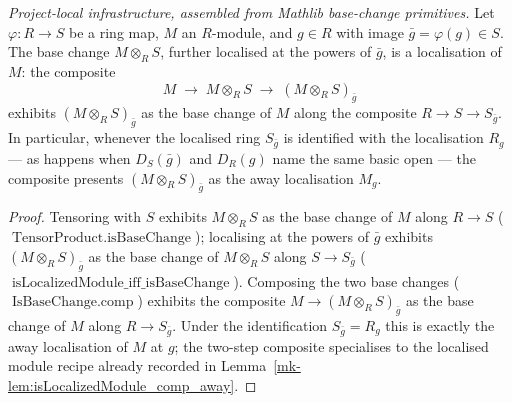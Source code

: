\begin{lemma}\label{mk-lem:isLocalizedModule_baseChange_away}
  \leanok

  \textit{Project-local infrastructure, assembled from Mathlib base-change primitives.}
  Let \(\varphi : R \to S\) be a ring map, \(M\) an \(R\)-module, and \(g \in R\) with image
  \(\bar g = \varphi(g) \in S\). The base change \(M \otimes_R S\), further localised at the powers of
  \(\bar g\), is a localisation of \(M\): the composite
  \[
    M \;\longrightarrow\; M \otimes_R S \;\longrightarrow\; (M \otimes_R S)_{\bar g}
  \]
  exhibits \((M \otimes_R S)_{\bar g}\) as the base change of \(M\) along the composite
  \(R \to S \to S_{\bar g}\). In particular, whenever the localised ring \(S_{\bar g}\) is identified
  with the localisation \(R_g\) --- as happens when \(D_S(\bar g)\) and \(D_R(g)\) name the same basic
  open --- the composite presents \((M \otimes_R S)_{\bar g}\) as the away localisation \(M_g\).
\end{lemma}
\begin{proof}
  \leanok
  Tensoring with \(S\) exhibits \(M \otimes_R S\) as the base change of \(M\) along \(R \to S\)
  (\(\operatorname{TensorProduct.isBaseChange}\)); localising at the powers of \(\bar g\) exhibits
  \((M \otimes_R S)_{\bar g}\) as the base change of \(M \otimes_R S\) along \(S \to S_{\bar g}\)
  (\(\operatorname{isLocalizedModule\_iff\_isBaseChange}\)). Composing the two base changes
  (\(\operatorname{IsBaseChange.comp}\)) exhibits the composite \(M \to (M \otimes_R S)_{\bar g}\) as the
  base change of \(M\) along \(R \to S_{\bar g}\). Under the identification \(S_{\bar g} = R_g\) this is
  exactly the away localisation of \(M\) at \(g\); the two-step composite specialises to the localised
  module recipe already recorded in Lemma~\ref{mk-lem:isLocalizedModule_comp_away}.
\end{proof}

